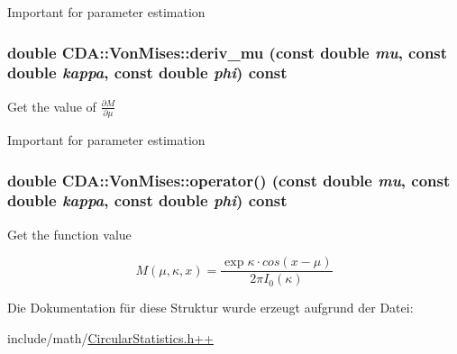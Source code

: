 Important for parameter estimation \hypertarget{structCDA_1_1VonMises_a3ea11829bbcebe3dbfc174deda47cf9f}{
\subsubsection[{deriv\_\-mu}]{\setlength{\rightskip}{0pt plus 5cm}double CDA::VonMises::deriv\_\-mu (const double {\em mu}, \/  const double {\em kappa}, \/  const double {\em phi}) const}}
\label{structCDA_1_1VonMises_a3ea11829bbcebe3dbfc174deda47cf9f}
Get the value of $\frac{\partial M}{\partial \mu}$

Important for parameter estimation \hypertarget{structCDA_1_1VonMises_a85bd82b40dd422b2c044bb31bbaede58}{
\subsubsection[{operator()}]{\setlength{\rightskip}{0pt plus 5cm}double CDA::VonMises::operator() (const double {\em mu}, \/  const double {\em kappa}, \/  const double {\em phi}) const}}
\label{structCDA_1_1VonMises_a85bd82b40dd422b2c044bb31bbaede58}
Get the function value

\[ M(\mu, \kappa, x) = \frac{\exp{\kappa \cdot cos (x-\mu)}}{2\pi I_0 (\kappa)} \] 

Die Dokumentation für diese Struktur wurde erzeugt aufgrund der Datei:\begin{DoxyCompactItemize}
\item 
include/math/\hyperlink{CircularStatistics_8h_09_09}{CircularStatistics.h++}\end{DoxyCompactItemize}
